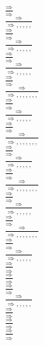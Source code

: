 \documentclass[11pt]{article}
\begin{document}
\begin{center}
\bigskip
\\$\frac{\Rightarrow }{\Rightarrow }$
\bigskip
\\$\frac{\Rightarrow }{\Rightarrow , , , , , }$
\bigskip
\\$\frac{\Rightarrow }{\Rightarrow }$
\bigskip
\\$\frac{\Rightarrow }{\Rightarrow , , , , , }$
\bigskip
\\$\frac{\Rightarrow }{\Rightarrow }$
\bigskip
\\$\frac{\Rightarrow }{\Rightarrow , , , , , }$
\bigskip
\\$\frac{\Rightarrow }{\Rightarrow }$
\bigskip
\\$\frac{\Rightarrow }{\Rightarrow , , , , , , , }$
\bigskip
\\$\frac{\Rightarrow }{\Rightarrow }$
\bigskip
\\$\frac{\Rightarrow }{\Rightarrow , , , , , }$
\bigskip
\\$\frac{\Rightarrow }{\Rightarrow }$
\bigskip
\\$\frac{\Rightarrow }{\Rightarrow , , , , , , , }$
\bigskip
\\$\frac{\Rightarrow }{\Rightarrow }$
\bigskip
\\$\frac{\Rightarrow }{\Rightarrow , , , , , }$
\bigskip
\\$\frac{\Rightarrow }{\Rightarrow }$
\bigskip
\\$\frac{\Rightarrow }{\Rightarrow , , , , , , , }$
\bigskip
\\$\frac{\Rightarrow }{\Rightarrow }$
\bigskip
\\$\frac{\Rightarrow }{\Rightarrow , , , , , }$
\bigskip
\\$\frac{\Rightarrow }{\Rightarrow }$
\bigskip
\\$\frac{\Rightarrow }{\Rightarrow , , , , , , , }$
\bigskip
\\$\frac{\Rightarrow }{\Rightarrow }$
\bigskip
\\$\frac{\Rightarrow }{\Rightarrow , , , , , }$
\bigskip
\\$\frac{\Rightarrow }{\Rightarrow }$
\bigskip
\\$\frac{\Rightarrow }{\Rightarrow }$
\bigskip
\\$\frac{\Rightarrow }{\Rightarrow }$
\bigskip
\\$\frac{\Rightarrow }{\Rightarrow , , , , , }$
\bigskip
\\$\frac{\Rightarrow }{\Rightarrow }$
\bigskip
\\$\frac{\Rightarrow }{\Rightarrow }$
\bigskip
\\$\frac{\Rightarrow }{\Rightarrow }$

\end{center}
\end{document}
